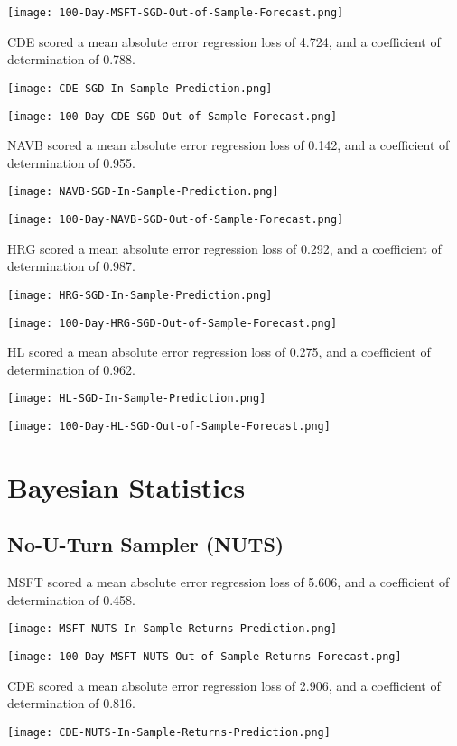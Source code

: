 \texttt{[image: 100-Day-MSFT-SGD-Out-of-Sample-Forecast.png]}

CDE scored a mean absolute error regression loss of 4.724, and a coefficient of determination of 0.788.

\texttt{[image: CDE-SGD-In-Sample-Prediction.png]}

\texttt{[image: 100-Day-CDE-SGD-Out-of-Sample-Forecast.png]}

NAVB scored a mean absolute error regression loss of 0.142, and a coefficient of determination of 0.955.

\texttt{[image: NAVB-SGD-In-Sample-Prediction.png]}

\texttt{[image: 100-Day-NAVB-SGD-Out-of-Sample-Forecast.png]}

HRG scored a mean absolute error regression loss of 0.292, and a coefficient of determination of 0.987.

\texttt{[image: HRG-SGD-In-Sample-Prediction.png]}

\texttt{[image: 100-Day-HRG-SGD-Out-of-Sample-Forecast.png]}

HL scored a mean absolute error regression loss of 0.275, and a coefficient of determination of 0.962.

\texttt{[image: HL-SGD-In-Sample-Prediction.png]}

\texttt{[image: 100-Day-HL-SGD-Out-of-Sample-Forecast.png]}

\section{Bayesian Statistics}

\subsection{No-U-Turn Sampler (NUTS)}
MSFT scored a mean absolute error regression loss of 5.606, and a coefficient of determination of 0.458.

\texttt{[image: MSFT-NUTS-In-Sample-Returns-Prediction.png]}

\texttt{[image: 100-Day-MSFT-NUTS-Out-of-Sample-Returns-Forecast.png]}

CDE scored a mean absolute error regression loss of 2.906, and a coefficient of determination of 0.816.

\texttt{[image: CDE-NUTS-In-Sample-Returns-Prediction.png]}

